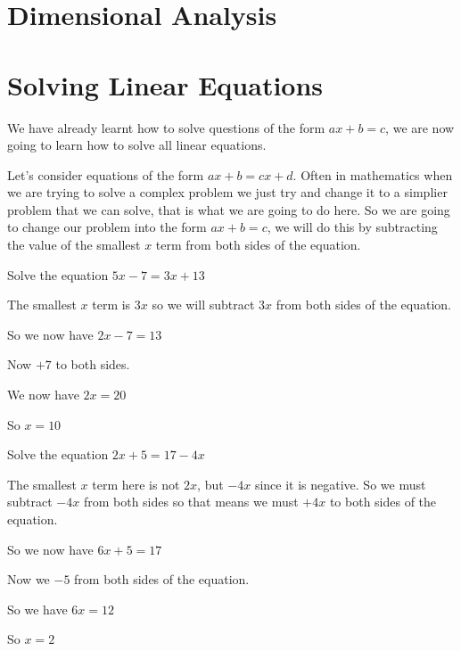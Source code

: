 \section{Dimensional Analysis}
\section{Solving Linear Equations}
We have already learnt how to solve questions of the form $ax+b=c$, we are now going to learn how to solve all linear equations.

\bigskip

Let's consider equations of the form $ax+b=cx+d$.  Often in mathematics when we are trying to solve a complex problem we just try and change it to a simplier problem that we can solve, that is what we are going to do here.  So we are going to change our problem into the form $ax+b=c$, we will do this by subtracting the value of the smallest $x$ term from both sides of the equation.

\begin{exmp}
Solve the equation $5x-7=3x+13$

\bigskip

The smallest $x$ term is $3x$ so we will subtract $3x$ from both sides of the equation.

\bigskip

So we now have $2x-7=13$

\bigskip

Now $+7$ to both sides.

\bigskip

We now have $2x=20$

\bigskip

So $x=10$
\end{exmp}

\begin{exmp}
Solve the equation $2x+5=17-4x$

\bigskip

The smallest $x$ term here is not $2x$, but $-4x$ since it is negative.  So we must subtract $-4x$ from both sides so that means we must $+4x$ to both sides of the equation.

\bigskip

So we now have $6x+5=17$

\bigskip

Now we $-5$ from both sides of the equation.

\bigskip

So we have $6x=12$

\bigskip

So $x=2$
\end{exmp}

